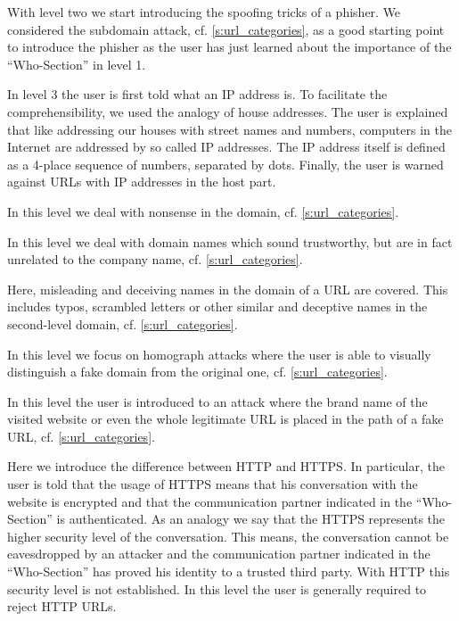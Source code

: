 \begin{description}[leftmargin=0cm]
	\item[Level 2:] With level two we start introducing the spoofing tricks of a phisher.
 We considered the subdomain attack, cf. \autoref{s:url_categories}, as a good starting point to introduce the phisher as the user has just learned about the importance of the ``Who-Section'' in level 1.
	\item[Level 3:] In level 3 the user is first told what an IP address is.
 To facilitate the comprehensibility, we used the analogy of house addresses.
 The user is explained that like addressing our houses with street names and numbers, computers in the Internet are addressed by so called IP addresses.
 The IP address itself is defined as a 4-place sequence of numbers, separated by dots.
 Finally, the user is warned against URLs with IP addresses in the host part.
	\item[Level 4:] In this level we deal with nonsense in the domain, cf. \autoref{s:url_categories}.
	\item[Level 5:] In this level we deal with domain names which sound trustworthy, but are in fact unrelated to the company name, cf. \autoref{s:url_categories}.
	\item[Level 6:] Here, misleading and deceiving names in the domain of a URL are covered.
 This includes typos, scrambled letters or other similar and deceptive names in the second-level domain, cf. \autoref{s:url_categories}.
	\item[Level 7:] In this level we focus on homograph attacks where the user is able to visually distinguish a fake domain from the original one, cf. \autoref{s:url_categories}.
	\item[Level 8:] In this level the user is introduced to an attack where the brand name of the visited website or even the whole legitimate URL is placed in the path of a fake URL, cf. \autoref{s:url_categories}.
	\item[Level 9:] Here we introduce the difference between HTTP and HTTPS. In particular, the user is told that the usage of HTTPS means that his conversation with the website is encrypted and that the communication partner indicated in the ``Who-Section'' is authenticated.
 As an analogy we say that the HTTPS represents the higher security level of the conversation.
 This means, the conversation cannot be eavesdropped by an attacker and the communication partner indicated in the ``Who-Section'' has proved his identity to a trusted third party.
 With HTTP this security level is not established.
In this level the user is generally required to reject HTTP URLs.

\end{description}
